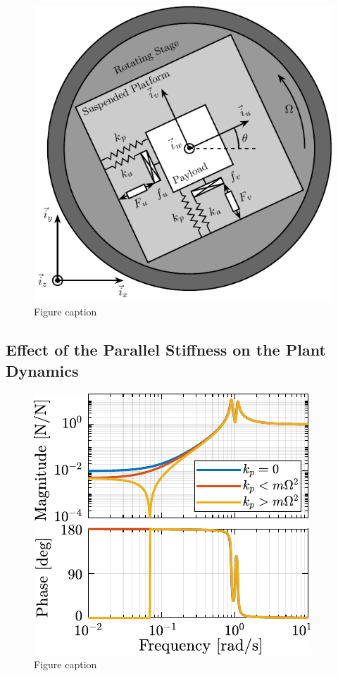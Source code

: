 \documentclass{ISMA_USD2020}
\begin{document}
\begin{figure}[htbp]
\centering
\includegraphics[scale=1]{figs/system_parallel_springs.pdf}
\caption{\label{fig:system_parallel_springs}Figure caption}
\end{figure}

\subsection{Effect of the Parallel Stiffness on the Plant Dynamics}
\label{sec:org8097ba5}

\begin{figure}[htbp]
\centering
\includegraphics[scale=1]{figs/plant_iff_kp.pdf}
\caption{\label{fig:plant_iff_kp}Figure caption}
\end{figure}
\end{document}
